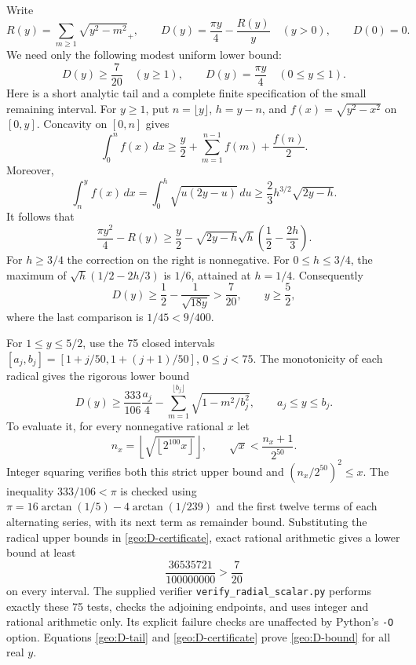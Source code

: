 \documentclass[11pt,reqno]{amsart}
\numberwithin{equation}{section}
\begin{document}
Write
\[
 R(y)=\sum_{m\ge1}\sqrt{y^2-m^2}_+,
 \qquad D(y)=\frac{\pi y}{4}-\frac{R(y)}y\quad(y>0),
 \qquad D(0)=0.
\]
We need only the following modest uniform lower bound:
\begin{equation}\label{geo:D-bound}
 D(y)\ge\frac7{20}\quad(y\ge1),
 \qquad D(y)=\frac{\pi y}{4}\quad(0\le y\le1).
\end{equation}
Here is a short analytic tail and a complete finite specification of the
small remaining interval.  For $y\ge1$, put $n=\lfloor y\rfloor$,
$h=y-n$, and $f(x)=\sqrt{y^2-x^2}$ on $[0,y]$.  Concavity on $[0,n]$
gives
\[
 \int_0^n f(x)\,dx\ge\frac y2+
              \sum_{m=1}^{n-1}f(m)+\frac{f(n)}2.
\]
Moreover,
\[
 \int_n^y f(x)\,dx
   =\int_0^h\sqrt{u(2y-u)}\,du
   \ge\frac23h^{3/2}\sqrt{2y-h}.
\]
It follows that
\[
 \frac{\pi y^2}{4}-R(y)
   \ge\frac y2-\sqrt{2y-h}\sqrt h\left(\frac12-\frac{2h}{3}\right).
\]
For $h\ge3/4$ the correction on the right is nonnegative.  For
$0\le h\le3/4$, the maximum of
$\sqrt h(1/2-2h/3)$ is $1/6$, attained at $h=1/4$.
Consequently
\begin{equation}\label{geo:D-tail}
 D(y)\ge\frac12-\frac1{\sqrt{18y}}>\frac7{20},
                       \qquad y\ge\frac52,
\end{equation}
where the last comparison is $1/45<9/400$.

For $1\le y\le5/2$, use the 75 closed intervals
$[a_j,b_j]=[1+j/50,1+(j+1)/50]$, $0\le j<75$.
The monotonicity of each radical gives the rigorous lower bound
\begin{equation}\label{geo:D-certificate}
 D(y)\ge\frac{333}{106}\frac{a_j}{4}
   -\sum_{m=1}^{\lfloor b_j\rfloor}
                   \sqrt{1-m^2/b_j^2},\qquad a_j\le y\le b_j.
\end{equation}
To evaluate it, for every nonnegative rational $x$ let
\[
 n_x=\left\lfloor\sqrt{\left\lfloor2^{100}x\right\rfloor}\right\rfloor,
 \qquad \sqrt{x}<\frac{n_x+1}{2^{50}}.
\]
Integer squaring verifies both this strict upper bound and
$(n_x/2^{50})^2\le x$.  The inequality $333/106<\pi$ is checked using
$\pi=16\arctan(1/5)-4\arctan(1/239)$ and the first twelve terms of each
alternating series, with its next term as remainder bound.  Substituting
the radical upper bounds in \eqref{geo:D-certificate}, exact rational
arithmetic gives a lower bound at least
\[
 \frac{36535721}{100000000}>\frac7{20}
\]
on every interval.  The supplied verifier
\texttt{verify\_radial\_scalar.py} performs exactly these 75 tests,
checks the adjoining endpoints, and uses integer and rational arithmetic
only.  Its explicit failure checks are unaffected by Python's
\texttt{-O} option.  Equations \eqref{geo:D-tail} and
\eqref{geo:D-certificate} prove \eqref{geo:D-bound} for all real $y$.
\end{document}
